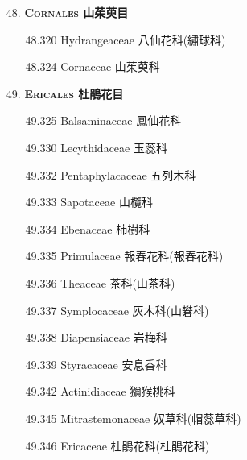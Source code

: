 \begin{enumerate}
  \item[48. ] \textbf{\textsc{Cornales} 山茱萸目}   
    \begin{enumerate}
      \item[48.320] Hydrangeaceae 八仙花科(繡球科)     
        
      \item[48.324] Cornaceae 山茱萸科     
        
    \end{enumerate}
  \item[49. ] \textbf{\textsc{Ericales} 杜鵑花目}   
    \begin{enumerate}
      \item[49.325] Balsaminaceae 鳳仙花科     
        
      \item[49.330] Lecythidaceae 玉蕊科     
        
      \item[49.332] Pentaphylacaceae 五列木科     
        
      \item[49.333] Sapotaceae 山欖科     
        
      \item[49.334] Ebenaceae 柿樹科     
        
      \item[49.335] Primulaceae 報春花科(報春花科)     
        
      \item[49.336] Theaceae 茶科(山茶科)     
        
      \item[49.337] Symplocaceae 灰木科(山礬科)     
        
      \item[49.338] Diapensiaceae 岩梅科     
        
      \item[49.339] Styracaceae 安息香科     
        
      \item[49.342] Actinidiaceae 獼猴桃科     
        
      \item[49.345] Mitrastemonaceae 奴草科(帽蕊草科)     
        
      \item[49.346] Ericaceae 杜鵑花科(杜鵑花科)     
        
    \end{enumerate}
\end{enumerate}

